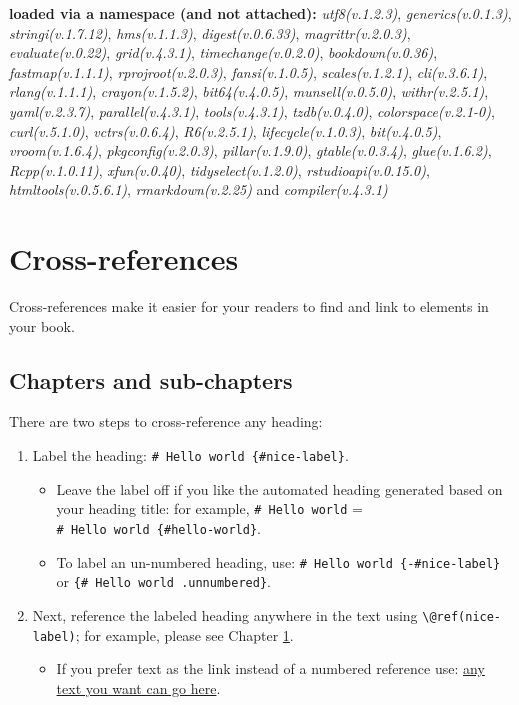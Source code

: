 \documentclass[
]{book}
\providecommand{\tightlist}{%
  \setlength{\itemsep}{0pt}\setlength{\parskip}{0pt}}
\theoremstyle{definition}
\theoremstyle{definition}
\theoremstyle{definition}
\theoremstyle{definition}
\theoremstyle{remark}
\begin{document}
\textbf{loaded via a namespace (and not attached):}
\emph{utf8(v.1.2.3)}, \emph{generics(v.0.1.3)}, \emph{stringi(v.1.7.12)}, \emph{hms(v.1.1.3)}, \emph{digest(v.0.6.33)}, \emph{magrittr(v.2.0.3)}, \emph{evaluate(v.0.22)}, \emph{grid(v.4.3.1)}, \emph{timechange(v.0.2.0)}, \emph{bookdown(v.0.36)}, \emph{fastmap(v.1.1.1)}, \emph{rprojroot(v.2.0.3)}, \emph{fansi(v.1.0.5)}, \emph{scales(v.1.2.1)}, \emph{cli(v.3.6.1)}, \emph{rlang(v.1.1.1)}, \emph{crayon(v.1.5.2)}, \emph{bit64(v.4.0.5)}, \emph{munsell(v.0.5.0)}, \emph{withr(v.2.5.1)}, \emph{yaml(v.2.3.7)}, \emph{parallel(v.4.3.1)}, \emph{tools(v.4.3.1)}, \emph{tzdb(v.0.4.0)}, \emph{colorspace(v.2.1-0)}, \emph{curl(v.5.1.0)}, \emph{vctrs(v.0.6.4)}, \emph{R6(v.2.5.1)}, \emph{lifecycle(v.1.0.3)}, \emph{bit(v.4.0.5)}, \emph{vroom(v.1.6.4)}, \emph{pkgconfig(v.2.0.3)}, \emph{pillar(v.1.9.0)}, \emph{gtable(v.0.3.4)}, \emph{glue(v.1.6.2)}, \emph{Rcpp(v.1.0.11)}, \emph{xfun(v.0.40)}, \emph{tidyselect(v.1.2.0)}, \emph{rstudioapi(v.0.15.0)}, \emph{htmltools(v.0.5.6.1)}, \emph{rmarkdown(v.2.25)} and \emph{compiler(v.4.3.1)}

\hypertarget{cross}{%
\chapter{Cross-references}\label{cross}}

Cross-references make it easier for your readers to find and link to elements in your book.

\hypertarget{chapters-and-sub-chapters}{%
\section{Chapters and sub-chapters}\label{chapters-and-sub-chapters}}

There are two steps to cross-reference any heading:

\begin{enumerate}
\def\labelenumi{\arabic{enumi}.}
\tightlist
\item
  Label the heading: \texttt{\#\ Hello\ world\ \{\#nice-label\}}.

  \begin{itemize}
  \tightlist
  \item
    Leave the label off if you like the automated heading generated based on your heading title: for example, \texttt{\#\ Hello\ world} = \texttt{\#\ Hello\ world\ \{\#hello-world\}}.
  \item
    To label an un-numbered heading, use: \texttt{\#\ Hello\ world\ \{-\#nice-label\}} or \texttt{\{\#\ Hello\ world\ .unnumbered\}}.
  \end{itemize}
\item
  Next, reference the labeled heading anywhere in the text using \texttt{\textbackslash{}@ref(nice-label)}; for example, please see Chapter \ref{cross}.

  \begin{itemize}
  \tightlist
  \item
    If you prefer text as the link instead of a numbered reference use: \protect\hyperlink{cross}{any text you want can go here}.
  \end{itemize}
\end{enumerate}
\end{document}

